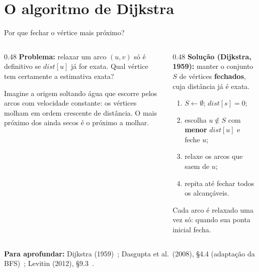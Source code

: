 \documentclass[aspectratio=169,xcolor=table]{beamer}
\newcommand{\fonte}[1]{%
  \vfill
  {\tiny\color{gray!55!black}\textbf{Para aprofundar:} #1\par}%
}
\begin{document}
\section{O algoritmo de Dijkstra}

\begin{frame}{Por que fechar o vértice mais próximo?}
  \begin{columns}[T]
    \begin{column}{0.48\textwidth}
      \textbf{Problema:} relaxar um arco $(u,v)$ só é definitivo se $\mathit{dist}[u]$ já for
      exata. Qual vértice tem certamente a estimativa exata?
      \medskip

      {\small Imagine a origem soltando água que escorre pelos arcos com velocidade
      constante: os vértices molham em ordem crescente de distância. O mais próximo dos ainda
      secos é o próximo a molhar.}
    \end{column}
    \begin{column}{0.48\textwidth}
      \textbf{Solução (Dijkstra, 1959):} manter o conjunto $S$ de vértices
      \textbf{fechados}, cuja distância já é exata.
      \begin{enumerate}
        \small
        \item $S \gets \emptyset$; $\mathit{dist}[s] = 0$;
        \item escolha $u \notin S$ com \textbf{menor} $\mathit{dist}[u]$ e feche $u$;
        \item relaxe os arcos que saem de $u$;
        \item repita até fechar todos os alcançáveis.
      \end{enumerate}
      {\small Cada arco é relaxado uma vez só: quando sua ponta inicial fecha.}
    \end{column}
  \end{columns}
  \fonte{Dijkstra (1959)~\cite{dijkstra1959note}; Dasgupta et al.\ (2008), \S 4.4
    (adaptação da BFS)~\cite{dasgupta2008algorithms}; Levitin (2012),
    \S 9.3~\cite{levitin2012introduction}.}
\end{frame}
\end{document}
